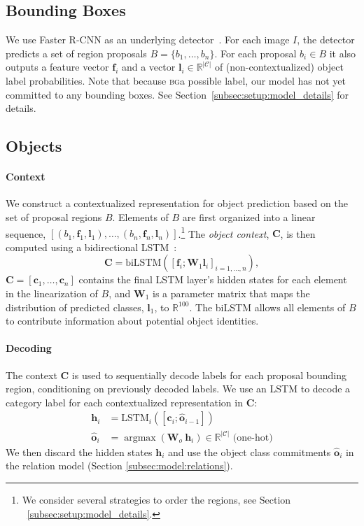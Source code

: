 \documentclass[10pt,twocolumn,letterpaper]{article}
\DeclareMathOperator*{\argmax}{argmax}
\newcommand{\R}{\mathbb{R}}   %
\newcommand{\card}[1]{\left\vert{#1}\right\vert}  %
\newcommand{\bg}{\textsc{bg}}  %
\newcommand{\term}[1]{\emph{#1}}  %
\newcommand{\vect}[1]{\mathbf{#1}}   %
\newcommand{\mat}[1]{\mathbf{#1}}    %
\begin{document}
\subsection{Bounding Boxes}\label{subsec:model:bounding_boxes}

We use Faster R-CNN as an underlying detector~\cite{ren_faster_2015}.
For each image $I$, the detector predicts a set of region proposals $B = \{ b_1, \ldots, b_n \}$.
For each proposal $b_i \in B$ it also outputs a feature vector $\vect{f}_i$ and a vector $\vect{l}_i \in \R^{\card{\mathcal{C}}}$ of (non-contextualized) object label probabilities.
Note that because \bg\is a possible label, our model has not yet committed to any bounding boxes.
See Section~\ref{subsec:setup:model_details} for details.

\subsection{Objects}\label{subsec:model:objects}\paragraph{Context}
We construct a contextualized representation for object prediction based on the set of proposal regions $B$.
Elements of $B$ are first organized into a linear sequence, $[(b_1,\vect{f}_1,\vect{l}_1), \ldots, (b_n,\vect{f}_n, \vect{l}_n)]$.\footnote{We consider several strategies to order the regions, see Section ~\ref{subsec:setup:model_details}.}
The \term{object context}, $\mat{C}$, is then computed using a bidirectional LSTM~\cite{Hochreiter:1997:LSM:1246443.1246450}:
\begin{equation}
\mat{C} = \text{biLSTM}(
  [\vect{f}_i; \mat{W}_1\vect{l}_i]_{i=1,\ldots,n}
),
\end{equation}$\mat{C} = [\vect{c}_1, \ldots, \vect{c}_n]$ contains the final LSTM layer's hidden states for each element in the linearization of $B$, and $\mathbf{W}_1$ is a parameter matrix that maps the distribution of predicted classes, $\vect{l}_1$, to $\R^{100}$. The biLSTM allows all elements of $B$ to contribute information about potential object identities.

\paragraph{Decoding}
The context $\mat{C}$ is used to sequentially decode labels for each proposal bounding region, conditioning on previously decoded labels.
We use an LSTM to decode a category label for each contextualized representation in $\mat{C}$:
\begin{align}
    \vect{h}_i &= \text{LSTM}_i\left( [\vect{c}_{i}; \vect{\hat{o}}_{i-1}] \right)\\
    \label{eqn:max_o}
    \vect{\hat{o}}_i &= \argmax{\left( \mat{W}_o~\vect{h}_i \right)} \in \R^{\card{\mathcal{C}}} \text{ (one-hot)}
\end{align}
We then discard the hidden states $\vect{h}_i$ and use the object class commitments $\vect{\hat{o}}_i$ in the relation model (Section \ref{subsec:model:relations}).
\end{document}
